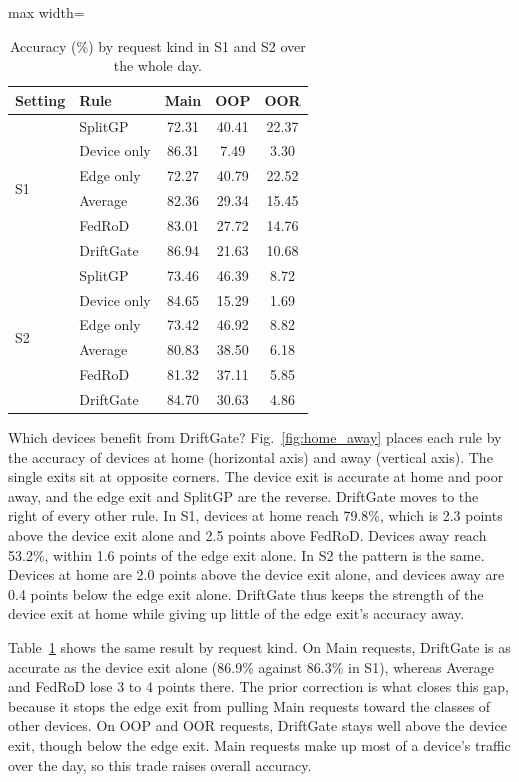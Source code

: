 \begin{table}[t]
\centering
\caption{Accuracy (\%) by request kind in S1 and S2 over the whole day.}
\label{tab:kinds}
\begin{adjustbox}{max width=\columnwidth}
\begin{tabular}{llccc}
\toprule
Setting & Rule & Main & OOP & OOR \\
\midrule
\multirow{6}{*}{S1} & SplitGP & 72.31 & 40.41 & 22.37 \\
 & Device only & 86.31 & 7.49 & 3.30 \\
 & Edge only & 72.27 & 40.79 & 22.52 \\
 & Average & 82.36 & 29.34 & 15.45 \\
 & FedRoD & 83.01 & 27.72 & 14.76 \\
 & DriftGate & 86.94 & 21.63 & 10.68 \\
\midrule
\multirow{6}{*}{S2} & SplitGP & 73.46 & 46.39 & 8.72 \\
 & Device only & 84.65 & 15.29 & 1.69 \\
 & Edge only & 73.42 & 46.92 & 8.82 \\
 & Average & 80.83 & 38.50 & 6.18 \\
 & FedRoD & 81.32 & 37.11 & 5.85 \\
 & DriftGate & 84.70 & 30.63 & 4.86 \\
\bottomrule
\end{tabular}
\end{adjustbox}
\end{table}

Which devices benefit from DriftGate? Fig.~\ref{fig:home_away} places each rule by the accuracy of devices at home (horizontal axis) and away (vertical axis). The single exits sit at opposite corners. The device exit is accurate at home and poor away, and the edge exit and SplitGP are the reverse. DriftGate moves to the right of every other rule. In S1, devices at home reach 79.8\%, which is 2.3 points above the device exit alone and 2.5 points above FedRoD. Devices away reach 53.2\%, within 1.6 points of the edge exit alone. In S2 the pattern is the same. Devices at home are 2.0 points above the device exit alone, and devices away are 0.4 points below the edge exit alone. DriftGate thus keeps the strength of the device exit at home while giving up little of the edge exit's accuracy away.

Table~\ref{tab:kinds} shows the same result by request kind. On Main requests, DriftGate is as accurate as the device exit alone (86.9\% against 86.3\% in S1), whereas Average and FedRoD lose 3 to 4 points there. The prior correction is what closes this gap, because it stops the edge exit from pulling Main requests toward the classes of other devices. On OOP and OOR requests, DriftGate stays well above the device exit, though below the edge exit. Main requests make up most of a device's traffic over the day, so this trade raises overall accuracy.

